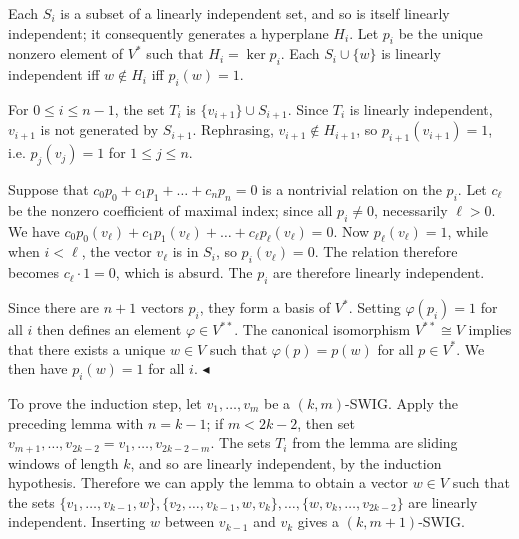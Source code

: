 \documentclass[10pt,a4paper]{article}
\begin{document}
Each $S_{i}$ is a subset of a linearly independent set, and so is itself linearly independent; it consequently generates a hyperplane $H_{i}$. Let $p_{i}$ be the unique nonzero element of $V^{*}$ such that $H_{i}=\ker p_{i}$. Each $S_{i}\cup\{w\}$ is linearly independent iff $w\notin H_{i}$ iff $p_{i}(w)=1$.\par




For $0\leq i\leq n-1$, the set $T_{i}$ is $\{v_{i+1}\}\cup S_{i+1}$. Since $T_{i}$ is linearly independent, $v_{i+1}$ is not generated by $S_{i+1}$. Rephrasing, $v_{i+1}\notin H_{i+1}$, so $p_{i+1}(v_{i+1})=1$, i.e. $p_{j}(v_{j})=1$ for $1\leq j\leq n$.\par




Suppose that $c_{0}p_{0}+c_{1}p_{1}+\dots+c_{n}p_{n}=0$ is a nontrivial relation on the $p_{i}$. Let $c_{\ell}$ be the nonzero coefficient of maximal index; since all $p_{i}\neq 0$, necessarily $\ell>0$. We have $c_{0}p_{0}(v_{\ell})+c_{1}p_{1}(v_{\ell})+\dots+c_{\ell}p_{\ell}(v_{\ell})=0$. Now $p_{\ell}(v_{\ell})=1$, while when $i<\ell$, the vector $v_{\ell}$ is in $S_{i}$, so $p_{i}(v_{\ell})=0$. The relation therefore becomes $c_{\ell}\cdot 1=0$, which is absurd. The $p_{i}$ are therefore linearly independent.\par




Since there are $n+1$ vectors $p_{i}$, they form a basis of $V^{*}$. Setting $\varphi(p_{i})=1$ for all $i$ then defines an element $\varphi\in V^{**}$. The canonical isomorphism $V^{**}\cong V$ implies that there exists a unique $w\in V$ such that $\varphi(p)=p(w)$ for all $p\in V^{*}$. We then have $p_{i}(w)=1$ for all $i$.
$\blacktriangleleft$\par




To prove the induction step, let $v_{1},\dots,v_{m}$ be a $(k,m)$-SWIG. Apply the preceding lemma with $n=k-1$; if $m<2k-2$, then set $v_{m+1},\dots,v_{2k-2}=v_{1},\dots,v_{2k-2-m}$. The sets $T_{i}$ from the lemma are sliding windows of length $k$, and so are linearly independent, by the induction hypothesis. Therefore we can apply the lemma to obtain a vector $w\in V$ such that the sets $\{v_{1},\dots,v_{k-1},w\},\{v_{2},\dots,v_{k-1},w,v_{k}\},\dots,\{w,v_{k},\dots,v_{2k-2}\}$ are linearly independent. Inserting $w$ between $v_{k-1}$ and $v_{k}$ gives a $(k,m+1)$-SWIG.\par
\end{document}
